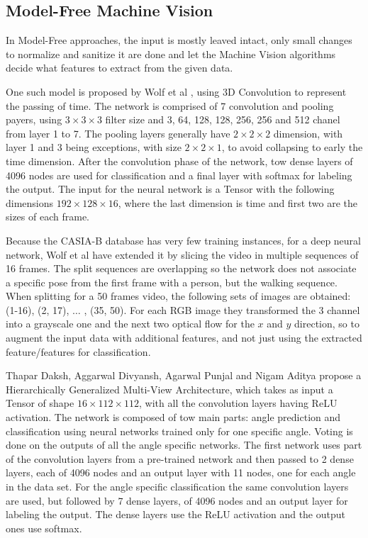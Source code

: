 \documentclass[12pt]{article}
\theoremstyle{definition}
\begin{document}
	\subsection{Model-Free Machine Vision}

	In Model-Free approaches, the input is mostly leaved intact, only small changes to normalize and sanitize it are done and let the Machine Vision algorithms decide what features to extract from the given data.

	One such model is proposed by Wolf et al \cite{Wolf2016MultiviewGR}, using 3D Convolution to represent the passing of time. The network is comprised of 7 convolution and pooling payers, using $3 \times 3 \times 3$ filter size and 3, 64, 128, 128, 256, 256 and 512 chanel from layer 1 to 7. The pooling layers generally have $2 \times 2 \times 2$ dimension, with layer 1 and 3 being exceptions, with size $2 \times 2 \times 1$, to avoid collapsing to early the time dimension. After the convolution phase of the network, tow dense layers of 4096 nodes are used for classification and a final layer with softmax for labeling the output. The input for the neural network is a Tensor with the following dimensions $192 \times 128 \times 16$, where the last dimension is time and first two are the sizes of each frame.

	Because the CASIA-B database has very few training instances, for a deep neural network, Wolf et al \cite{Wolf2016MultiviewGR} have extended it by slicing the video in multiple sequences of 16 frames. The split sequences are overlapping so the network does not associate a specific pose from the first frame with a person, but the walking sequence. When splitting for a 50 frames video, the following sets of images are obtained: (1-16), (2, 17), $\hdots$ , (35, 50). For each RGB image they transformed the 3 channel into a grayscale one and the next two optical flow for the $x$ and $y$ direction, so to augment the input data with additional features, and not just using the extracted feature/features for classification.

	Thapar Daksh, Aggarwal Divyansh, Agarwal Punjal and Nigam Aditya \cite{VGR-Net} propose a Hierarchically Generalized Multi-View Architecture, which takes as input a Tensor of shape $16 \times 112 \times 112$, with all the convolution layers having ReLU activation. The network is composed of tow main parts: angle prediction and classification using neural networks trained only for one specific angle. Voting is done on the outputs of all the angle specific networks. The first network uses part of the convolution layers from a pre-trained network and then passed to 2 dense layers, each of 4096 nodes and an output layer with 11 nodes, one for each angle in the data set. For the angle specific classification the same convolution layers are used, but followed by 7 dense layers, of 4096 nodes and an output layer for labeling the output. The dense layers use the ReLU activation and the output ones use softmax.
\end{document}
